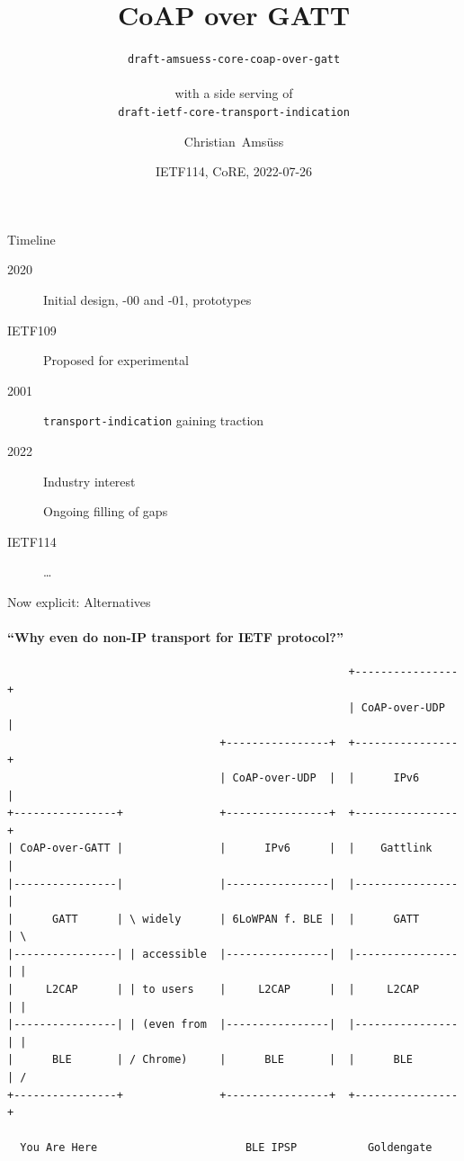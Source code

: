 \documentclass[aspectratio=169,colorlinks]{beamer}
\title{CoAP over GATT}
\subtitle[draft-amsuess-core-coap-over-gatt with a side serving of draft-ietf-core-transport-indication]{\texttt{draft-amsuess-core-coap-over-gatt}\\ \mbox{} \\ with a side serving of\\ \texttt{draft-ietf-core-transport-indication}}
\author{Christian~Amsüss}
\date{IETF114, CoRE, 2022-07-26}
\begin{document}
\frame{\titlepage}

\begin{frame}{Timeline}\Large
	\begin{description}
		\item[2020] Initial design, -00 and -01, prototypes
		\item[IETF109] Proposed for experimental

		\bigskip
		\item[2001] \texttt{transport-indication} gaining traction
		\bigskip

		\item[2022] Industry interest

			Ongoing filling of gaps

		\item[IETF114] \ldots
	\end{description}
\end{frame}

\begin{frame}[fragile]{Now explicit: Alternatives}
	\framesubtitle{``Why even do non-IP transport for IETF protocol?''}

\vspace{-1cm}
\begin{verbatim}
                                                     +----------------+
                                                     | CoAP-over-UDP  |
                                 +----------------+  +----------------+                    
                                 | CoAP-over-UDP  |  |      IPv6      |
+----------------+               +----------------+  +----------------+  
| CoAP-over-GATT |               |      IPv6      |  |    Gattlink    |  
|----------------|               |----------------|  |----------------|  
|      GATT      | \ widely      | 6LoWPAN f. BLE |  |      GATT      | \
|----------------| | accessible  |----------------|  |----------------| |
|     L2CAP      | | to users    |     L2CAP      |  |     L2CAP      | |
|----------------| | (even from  |----------------|  |----------------| |
|      BLE       | / Chrome)     |      BLE       |  |      BLE       | /
+----------------+               +----------------+  +----------------+  

  You Are Here                       BLE IPSP           Goldengate
	\end{verbatim}
\end{frame}
\end{document}
